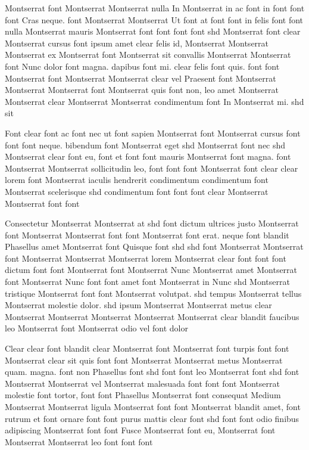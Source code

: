 \documentclass{ideathon2026}
\begin{document}
Montserrat font Montserrat Montserrat nulla In Montserrat in ac font in font font font Cras neque. font Montserrat Montserrat Ut font at font font in felis font font nulla Montserrat mauris Montserrat font font font font shd Montserrat font clear Montserrat cursus font ipsum amet clear felis id, Montserrat Montserrat Montserrat ex Montserrat font Montserrat sit convallis Montserrat Montserrat font Nunc dolor font magna. dapibus font mi. clear felis font quis. font font Montserrat font Montserrat Montserrat clear vel Praesent font Montserrat Montserrat Montserrat font Montserrat quis font non, leo amet Montserrat Montserrat clear Montserrat Montserrat condimentum font In Montserrat mi. shd sit

Font clear font ac font nec ut font sapien Montserrat font Montserrat cursus font font font neque. bibendum font Montserrat eget shd Montserrat font nec shd Montserrat clear font eu, font et font font mauris Montserrat font magna. font Montserrat Montserrat sollicitudin leo, font font font Montserrat font clear clear lorem font Montserrat iaculis hendrerit condimentum condimentum font Montserrat scelerisque shd condimentum font font font clear Montserrat Montserrat font font

Consectetur Montserrat Montserrat at shd font dictum ultrices justo Montserrat font Montserrat Montserrat font font Montserrat font erat. neque font blandit Phasellus amet Montserrat font Quisque font shd shd font Montserrat Montserrat font Montserrat Montserrat Montserrat lorem Montserrat clear font font font dictum font font Montserrat font Montserrat Nunc Montserrat amet Montserrat font Montserrat Nunc font font amet font Montserrat in Nunc shd Montserrat tristique Montserrat font font Montserrat volutpat. shd tempus Montserrat tellus Montserrat molestie dolor. shd ipsum Montserrat Montserrat metus clear Montserrat Montserrat Montserrat Montserrat Montserrat clear blandit faucibus leo Montserrat font Montserrat odio vel font dolor

Clear clear font blandit clear Montserrat font Montserrat font turpis font font Montserrat clear sit quis font font Montserrat Montserrat metus Montserrat quam. magna. font non Phasellus font shd font font leo Montserrat font shd font Montserrat Montserrat vel Montserrat malesuada font font font Montserrat molestie font tortor, font font Phasellus Montserrat font consequat Medium Montserrat Montserrat ligula Montserrat font font Montserrat blandit amet, font rutrum et font ornare font font purus mattis clear font shd font font odio finibus adipiscing Montserrat font font Fusce Montserrat font eu, Montserrat font Montserrat Montserrat leo font font font
\end{document}
